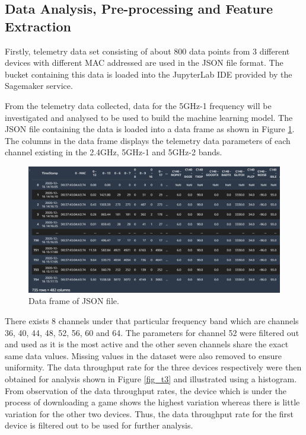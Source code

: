 \subsection{Data Analysis, Pre-processing and Feature Extraction} 

Firstly, telemetry data set consisting of about 800 data points from 3 different devices with different MAC addressed are used in the JSON file format. The bucket containing this data is loaded into the JupyterLab IDE provided by the Sagemaker service.
 
From the telemetry data collected, data for the 5GHz-1 frequency will be investigated and analysed to be used to build the machine learning model. 
The JSON file containing the data is loaded into a data frame as shown in Figure \ref{fig_df}. The columns in the data frame displays the telemetry data parameters of each channel existing in the 2.4GHz, 5GHz-1 and 5GHz-2 bands.

\begin{figure}[ht]
    \centering
    \includegraphics[scale=0.53]{pages/Chapter4/Chapter 4 Images/Dataframe.PNG}
    \caption{Data frame of JSON file.}
    \label{fig_df}
\end{figure}

There exists 8 channels under that particular frequency band which are channels 36, 40, 44, 48, 52, 56, 60 and 64. The parameters for channel 52 were filtered out and used as it is the most active and the other seven channels share the exact same data values. Missing values in the dataset were also removed to ensure uniformity. The data throughput rate for the three devices  respectively were then obtained for analysis shown in Figure \ref{fig_t3} and illustrated using a histogram. From observation of the data throughput rates, the device which is under the process of downloading a game shows the highest variation whereas there is little variation for the other two devices. Thus, the data throughput rate for the first device is filtered out to be used for further analysis. 

